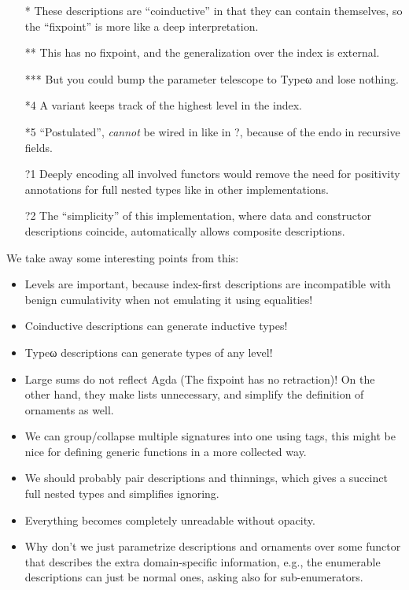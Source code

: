 \begin{itemize}
    \item[*] These descriptions are ``coinductive'' in that they can contain themselves, so the ``fixpoint'' is more like a deep interpretation.
    \item[**] This has no fixpoint, and the generalization over the index is external.
    \item[***] But you could bump the parameter telescope to Typeω and lose nothing.
    \item[*4] A variant keeps track of the highest level in the index.
    \item[*5] ``Postulated'', \emph{cannot} be wired in like in ?, because of the endo in recursive fields.
    \item[?1] Deeply encoding all involved functors would remove the need for positivity annotations for full nested types like in other implementations.
    \item[?2] The ``simplicity'' of this implementation, where data and constructor descriptions coincide, automatically allows composite descriptions.
\end{itemize}

We take away some interesting points from this:
\begin{itemize}
    \item Levels are important, because index-first descriptions are incompatible with benign cumulativity when not emulating it using equalities! 
    \item Coinductive descriptions can generate inductive types!
    \item Typeω descriptions can generate types of any level!
    \item Large sums do not reflect Agda (The fixpoint has no retraction)! On the other hand, they make lists unnecessary, and simplify the definition of ornaments as well.
    \item We can group/collapse multiple signatures into one using tags, this might be nice for defining generic functions in a more collected way.
    \item We should probably pair descriptions and thinnings, which gives a succinct full nested types and simplifies ignoring.
    \item Everything becomes completely unreadable without opacity.
    \item Why don't we just parametrize descriptions and ornaments over some functor that describes the extra domain-specific information, e.g., the enumerable descriptions can just be normal ones, asking also for sub-enumerators. 
\end{itemize}


